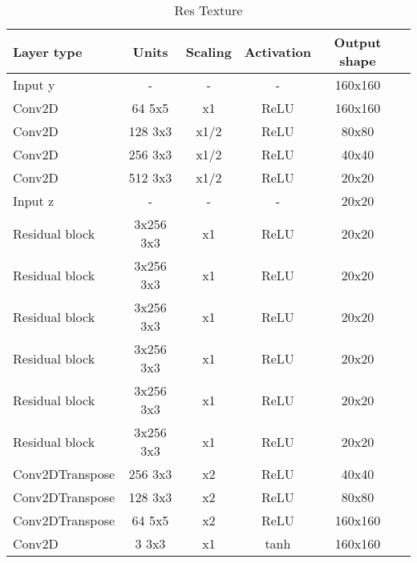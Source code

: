 \begin{table*}[h]
	\centering
	\begin{tabular}{|l|c|c|c|c|c|}
		\hline
		Layer type & Units & Scaling & Activation & Output shape\\
		\hline
		Input y & - & - & - & 160x160\\
		Conv2D & 64 5x5 & x1 & ReLU & 160x160 \\
		Conv2D & 128 3x3 & x1/2 & ReLU & 80x80 \\
		Conv2D & 256 3x3 & x1/2 & ReLU & 40x40 \\
		Conv2D & 512 3x3 & x1/2 & ReLU & 20x20 \\
		Input z & - & - & - & 20x20 \\
		Residual block & 3x256 3x3 & x1 & ReLU & 20x20 \\
		Residual block & 3x256 3x3 & x1 & ReLU & 20x20 \\
		Residual block & 3x256 3x3 & x1 & ReLU & 20x20 \\
		Residual block & 3x256 3x3 & x1 & ReLU & 20x20 \\
		Residual block & 3x256 3x3 & x1 & ReLU & 20x20 \\
		Residual block & 3x256 3x3 & x1 & ReLU & 20x20 \\
		Conv2DTranspose & 256 3x3 & x2 & ReLU & 40x40 \\
		Conv2DTranspose & 128 3x3 & x2 & ReLU & 80x80 \\
		Conv2DTranspose & 64 5x5 & x2 & ReLU & 160x160 \\
		Conv2D & 3 3x3 & x1 & tanh & 160x160 \\
		\hline
	\end{tabular}
	\caption{Res Texture}
\end{table*}



